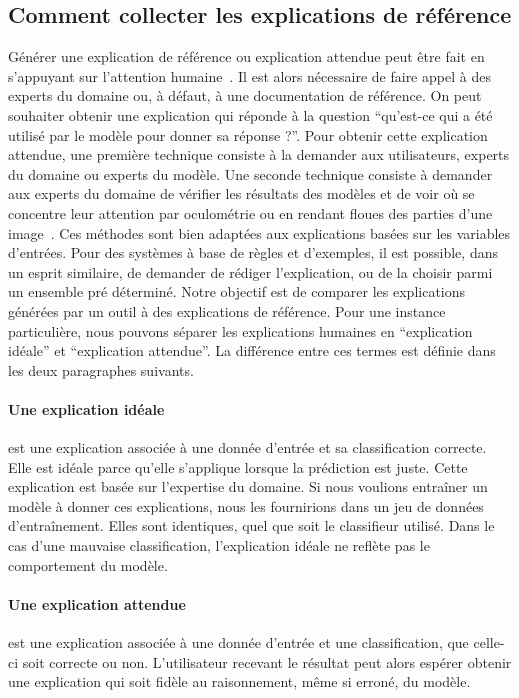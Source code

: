 \subsection{Comment collecter les explications de référence} \label{C2:ground_truth}
Générer une explication de référence ou explication attendue peut être fait en s'appuyant sur l'attention humaine~\cite{Mohseni2021}. Il est alors nécessaire de faire appel à des experts du domaine ou, à défaut, à une documentation de référence.
On peut souhaiter obtenir une explication qui réponde à la question ``qu'est-ce qui a été utilisé par le modèle pour donner sa réponse ?''.
Pour obtenir cette explication attendue, une première technique consiste à la demander aux utilisateurs, experts du domaine ou experts du modèle.
Une seconde technique consiste à demander aux experts du domaine de vérifier les résultats des modèles et de voir où se concentre leur attention par oculométrie ou en rendant floues des parties d'une image~\cite{Das2017}. Ces méthodes sont bien adaptées aux explications basées sur les variables d'entrées. Pour des systèmes à base de règles et d'exemples, il est possible, dans un esprit similaire, de demander de rédiger l'explication, ou de la choisir parmi un ensemble pré déterminé.
Notre objectif est de comparer les explications générées par un outil à des explications de référence. Pour une instance particulière, nous pouvons séparer les explications humaines en ``explication idéale'' et ``explication attendue''. La différence entre ces termes est définie dans les deux paragraphes suivants.

\paragraph{Une explication idéale} est une explication associée à une donnée d'entrée et sa classification correcte. Elle est idéale parce qu'elle s'applique lorsque la prédiction est juste. Cette explication est basée sur l'expertise du domaine. Si nous voulions entraîner un modèle à donner ces explications, nous les fournirions dans un jeu de données d'entraînement. Elles sont identiques, quel que soit le classifieur utilisé. Dans le cas d'une mauvaise classification, l'explication idéale ne reflète pas le comportement du modèle.

\paragraph{Une explication attendue} est une explication associée à une donnée d'entrée et une classification, que celle-ci soit correcte ou non. L'utilisateur recevant le résultat peut alors espérer obtenir une explication qui soit fidèle au raisonnement, même si erroné, du modèle.

